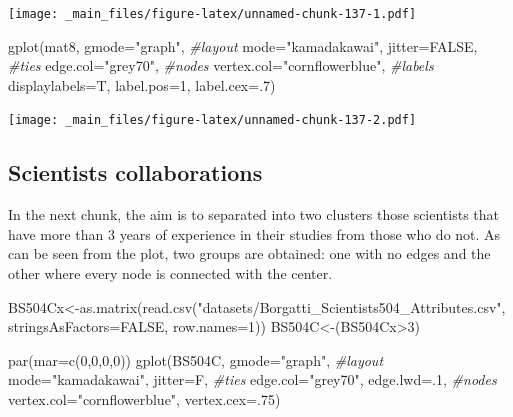 \documentclass[
  notitlepage,
  onecolumn,
  openany]{book}
\newenvironment{Shaded}{\begin{snugshade}}{\end{snugshade}}
\newcommand{\AttributeTok}[1]{\textcolor[rgb]{0.77,0.63,0.00}{#1}}
\newcommand{\CommentTok}[1]{\textcolor[rgb]{0.56,0.35,0.01}{\textit{#1}}}
\newcommand{\ConstantTok}[1]{\textcolor[rgb]{0.00,0.00,0.00}{#1}}
\newcommand{\DecValTok}[1]{\textcolor[rgb]{0.00,0.00,0.81}{#1}}
\newcommand{\FunctionTok}[1]{\textcolor[rgb]{0.00,0.00,0.00}{#1}}
\newcommand{\NormalTok}[1]{#1}
\newcommand{\OtherTok}[1]{\textcolor[rgb]{0.56,0.35,0.01}{#1}}
\newcommand{\SpecialCharTok}[1]{\textcolor[rgb]{0.00,0.00,0.00}{#1}}
\newcommand{\StringTok}[1]{\textcolor[rgb]{0.31,0.60,0.02}{#1}}
\begin{document}
\texttt{[image: \_main\_files/figure-latex/unnamed-chunk-137-1.pdf]}

\begin{Shaded}
\begin{Highlighting}[]
\FunctionTok{gplot}\NormalTok{(mat8, }
      \AttributeTok{gmode=}\StringTok{"graph"}\NormalTok{,}
      \CommentTok{\#layout}
      \AttributeTok{mode=}\StringTok{"kamadakawai"}\NormalTok{,}
      \AttributeTok{jitter=}\ConstantTok{FALSE}\NormalTok{,}
      \CommentTok{\#ties}
      \AttributeTok{edge.col=}\StringTok{"grey70"}\NormalTok{,}
      \CommentTok{\#nodes}
      \AttributeTok{vertex.col=}\StringTok{"cornflowerblue"}\NormalTok{,}
      \CommentTok{\#labels}
      \AttributeTok{displaylabels=}\NormalTok{T,}
      \AttributeTok{label.pos=}\DecValTok{1}\NormalTok{,}
      \AttributeTok{label.cex=}\NormalTok{.}\DecValTok{7}\NormalTok{)}
\end{Highlighting}
\end{Shaded}

\texttt{[image: \_main\_files/figure-latex/unnamed-chunk-137-2.pdf]}

\hypertarget{scientists-collaborations}{%
\subsection{Scientists collaborations}\label{scientists-collaborations}}

In the next chunk, the aim is to separated into two clusters those scientists that have more than 3 years of experience in their studies from those who do not. As can be seen from the plot, two groups are obtained: one with no edges and the other where every node is connected with the center.

\begin{Shaded}
\begin{Highlighting}[]
\NormalTok{BS504Cx}\OtherTok{\textless{}{-}}\FunctionTok{as.matrix}\NormalTok{(}\FunctionTok{read.csv}\NormalTok{(}\StringTok{"datasets/Borgatti\_Scientists504\_Attributes.csv"}\NormalTok{,}
                            \AttributeTok{stringsAsFactors=}\ConstantTok{FALSE}\NormalTok{, }\AttributeTok{row.names=}\DecValTok{1}\NormalTok{))}
\NormalTok{BS504C}\OtherTok{\textless{}{-}}\NormalTok{(BS504Cx}\SpecialCharTok{\textgreater{}}\DecValTok{3}\NormalTok{)}

\FunctionTok{par}\NormalTok{(}\AttributeTok{mar=}\FunctionTok{c}\NormalTok{(}\DecValTok{0}\NormalTok{,}\DecValTok{0}\NormalTok{,}\DecValTok{0}\NormalTok{,}\DecValTok{0}\NormalTok{))}
\FunctionTok{gplot}\NormalTok{(BS504C, }
      \AttributeTok{gmode=}\StringTok{"graph"}\NormalTok{,}
      \CommentTok{\#layout}
      \AttributeTok{mode=}\StringTok{"kamadakawai"}\NormalTok{,}
      \AttributeTok{jitter=}\NormalTok{F,}
      \CommentTok{\#ties}
      \AttributeTok{edge.col=}\StringTok{"grey70"}\NormalTok{, }
      \AttributeTok{edge.lwd=}\NormalTok{.}\DecValTok{1}\NormalTok{,}
      \CommentTok{\#nodes}
      \AttributeTok{vertex.col=}\StringTok{"cornflowerblue"}\NormalTok{,}
      \AttributeTok{vertex.cex=}\NormalTok{.}\DecValTok{75}\NormalTok{)}
\end{Highlighting}
\end{Shaded}
\end{document}

